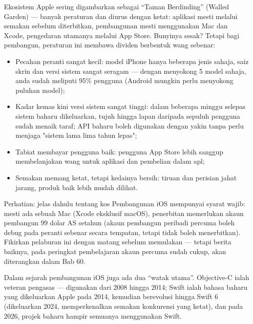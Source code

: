 
Ekosistem Apple sering digambarkan sebagai “Taman Berdinding” (Walled Garden) — banyak peraturan dan diurus dengan ketat: aplikasi mesti melalui semakan sebelum diterbitkan, pembangunan mesti menggunakan Mac dan Xcode, pengedaran utamanya melalui App Store. Bunyinya sesak? Tetapi bagi pembangun, peraturan ini membawa dividen berbentuk wang sebenar:

\begin{itemize}
  \item Pecahan peranti sangat kecil: model iPhone hanya beberapa jenis sahaja, saiz skrin dan versi sistem sangat seragam — dengan menyokong 5 model sahaja, anda sudah meliputi 95\% pengguna (Android mungkin perlu menyokong puluhan model);
  \item Kadar kemas kini versi sistem sangat tinggi: dalam beberapa minggu selepas sistem baharu dikeluarkan, tujuh hingga lapan daripada sepuluh pengguna sudah menaik taraf; API baharu boleh digunakan dengan yakin tanpa perlu menjaga "sistem lama lima tahun lepas";
  \item Tabiat membayar pengguna baik: pengguna App Store lebih sanggup membelanjakan wang untuk aplikasi dan pembelian dalam apl;
  \item Semakan memang ketat, tetapi kedainya bersih: tiruan dan perisian jahat jarang, produk baik lebih mudah dilihat.
\end{itemize}

\begin{tcbwarn}{Perhatian: jelas dahulu tentang kos}
Pembangunan iOS mempunyai syarat wajib: mesti ada sebuah Mac (Xcode eksklusif macOS), penerbitan memerlukan akaun pembangun 99 dolar AS setahun (akaun pembangun peribadi percuma boleh debug pada peranti sebenar secara tempatan, tetapi tidak boleh menerbitkan). Fikirkan pelaburan ini dengan matang sebelum memulakan — tetapi berita baiknya, pada peringkat pembelajaran akaun percuma sudah cukup, akan diterangkan dalam Bab 60.

\end{tcbwarn}


Dalam sejarah pembangunan iOS juga ada dua “watak utama”. Objective-C ialah veteran pengasas — digunakan dari 2008 hingga 2014; Swift ialah bahasa baharu yang dikeluarkan Apple pada 2014, kemudian berevolusi hingga Swift 6 (dikeluarkan 2024, memperkenalkan semakan konkurensi yang ketat), dan pada 2026, projek baharu hampir semuanya menggunakan Swift.

